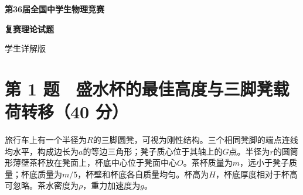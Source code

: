 \documentclass[12pt,a4paper,fontset=fandol]{ctexart}
\begin{document}
\begin{titlepage}
\thispagestyle{empty}
\vspace*{27mm}
\begin{center}
{\LARGE\bfseries 第36届全国中学生物理竞赛\par}
\vspace{8mm}
{\LARGE\bfseries 复赛理论试题\par}
\vspace{17mm}
{\Large 学生详解版\par}
\end{center}
\vfill
\end{titlepage}
\setcounter{page}{1}
\section{第 1 题　盛水杯的最佳高度与三脚凳载荷转移（40
分）}\label{ux7b2c-1-ux9898-ux76dbux6c34ux676fux7684ux6700ux4f73ux9ad8ux5ea6ux4e0eux4e09ux811aux51f3ux8f7dux8377ux8f6cux79fb40-ux5206}

旅行车上有一个半径为\(R\)的三脚圆凳，可视为刚性结构。三个相同凳脚的端点连线均水平，构成边长为\(a\)的等边三角形；凳子质心位于其轴上的\(G\)点。半径为\(r\)的圆筒形薄壁茶杯放在凳面上，杯底中心位于凳面中心\(O\)。茶杯质量为\(m\)，远小于凳子质量；杯底质量为\(m/5\)，杯壁和杯底各自质量均匀。杯高为\(H\)，杯底厚度相对于杯高可忽略。茶水密度为\(\rho\)，重力加速度为\(g\)。
\end{document}
